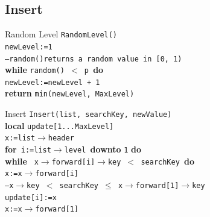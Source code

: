 \documentclass[12pt]{beamer}
\begin{document}
\subsection{Insert}
\begin{frame}{Random Level}
\texttt{RandomLevel()} \\
\quad \texttt{newLevel:=1}  \\
\quad \texttt{--random()returns a random value in [0, 1)} \\
\quad \textbf{while }\texttt{random() $<$ p }\textbf{do} \\
\quad\quad \texttt{newLevel:=newLevel + 1} \\
\quad \textbf{return } \texttt{min(newLevel, MaxLevel)}
\end{frame}

\begin{frame}{Insert }
\texttt{Insert(list, searchKey, newValue)} \\
\quad \textbf{local }\texttt{update[1...MaxLevel]}\\
\quad \texttt{x:=list$\rightarrow$header} \\
\quad\textbf{for}\texttt{ i:=list$\rightarrow$level }\textbf{downto} \texttt{1} \textbf{do} \\
\quad \quad \textbf{while} \texttt{ x$\rightarrow$forward[i]$\rightarrow$key $<$ searchKey }\textbf{do} \\
\quad\quad\quad \texttt{x:=x$\rightarrow$forward[i]} \\
\quad\quad \texttt{--x$\rightarrow$key $<$ searchKey $\leq$ x$\rightarrow$forward[1]$\rightarrow$key} \\
\quad\quad\texttt{update[i]:=x} \\
\quad \texttt{x:=x$\rightarrow$forward[1]} \\
\end{frame}
\end{document}
